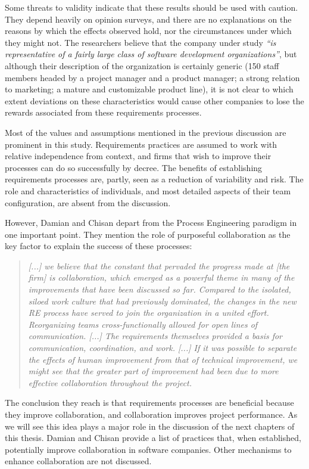 Some threats to validity indicate that these results should be used with caution. They depend heavily on opinion surveys, and there are no explanations on the reasons by which the effects observed hold, nor the circumstances under which they might not. The researchers believe that the company under study \emph{``is representative of a fairly large class of software development organizations''}, but although their description of the organization is certainly generic (150 staff members headed by a project manager and a product manager; a strong relation to marketing; a mature and customizable product line), it is not clear to which extent deviations on these characteristics would cause other companies to lose the rewards associated from these requirements processes.

Most of the values and assumptions mentioned in the previous discussion are prominent in this study. Requirements practices are assumed to work with relative independence from context, and firms that wish to improve their processes can do so successfully by decree. The benefits of establishing requirements processes are, partly, seen as a reduction of variability and risk. The role and characteristics of individuals, and most detailed aspects of their team configuration, are absent from the discussion.

However, Damian and Chisan depart from the Process Engineering paradigm in one important point. They mention the role of purposeful collaboration as the key factor to explain the success of these processes:

\begin{quote}
\emph{[...] we believe that the constant that pervaded the progress made at [the firm] is collaboration, which emerged as a powerful theme in many of the improvements that have been discussed so far. Compared to the isolated, siloed work culture that had previously dominated, the changes in the new RE process have served to join the organization in a united effort. Reorganizing teams cross-functionally allowed for open lines of communication. [...] The requirements themselves provided a basis for communication, coordination, and work. [...] If it was possible to separate the effects of human improvement from that of technical improvement, we might see that the greater part of improvement had been due to more effective collaboration throughout the project.}
\end{quote}

The conclusion they reach is that requirements processes are beneficial because they improve collaboration, and collaboration improves project performance. As we will see this idea plays a major role in the discussion of the next chapters of this thesis. Damian and Chisan provide a list of practices that, when established, potentially improve collaboration in software companies. Other mechanisms to enhance collaboration are not discussed.


